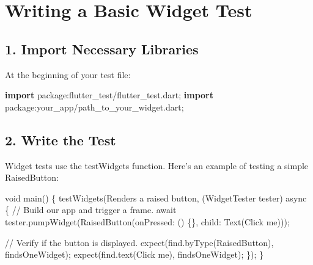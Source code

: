 \documentclass[
]{article}
\newenvironment{Shaded}{\begin{snugshade}}{\end{snugshade}}
\newcommand{\AttributeTok}[1]{\textcolor[rgb]{0.16,0.50,0.73}{#1}}
\newcommand{\CommentTok}[1]{\textcolor[rgb]{0.48,0.49,0.49}{#1}}
\newcommand{\DataTypeTok}[1]{\textcolor[rgb]{0.16,0.50,0.73}{#1}}
\newcommand{\KeywordTok}[1]{\textcolor[rgb]{0.81,0.81,0.76}{\textbf{#1}}}
\newcommand{\NormalTok}[1]{\textcolor[rgb]{0.81,0.81,0.76}{#1}}
\newcommand{\OperatorTok}[1]{\textcolor[rgb]{0.81,0.81,0.76}{#1}}
\newcommand{\StringTok}[1]{\textcolor[rgb]{0.96,0.31,0.31}{#1}}
\begin{document}
\section{Writing a Basic Widget Test}\label{writing-a-basic-widget-test}

\subsection{1. Import Necessary
Libraries}\label{import-necessary-libraries}

At the beginning of your test file:

\begin{Shaded}
\begin{Highlighting}[]
\KeywordTok{import} \StringTok{\textquotesingle{}package:flutter\_test/flutter\_test.dart\textquotesingle{}}\NormalTok{;}
\KeywordTok{import} \StringTok{\textquotesingle{}package:your\_app/path\_to\_your\_widget.dart\textquotesingle{}}\NormalTok{;}
\end{Highlighting}
\end{Shaded}

\subsection{2. Write the Test}\label{write-the-test-1}

Widget tests use the testWidgets function. Here's an example of testing
a simple RaisedButton:

\begin{Shaded}
\begin{Highlighting}[]
\DataTypeTok{void}\NormalTok{ main() }\OperatorTok{\{}
\NormalTok{  testWidgets(}\StringTok{\textquotesingle{}Renders a raised button\textquotesingle{}}\OperatorTok{,}\NormalTok{ (WidgetTester tester) }\AttributeTok{async} \OperatorTok{\{}
    \CommentTok{// Build our app and trigger a frame.}
    \AttributeTok{await}\NormalTok{ tester}\OperatorTok{.}\NormalTok{pumpWidget(RaisedButton(onPressed}\OperatorTok{:}\NormalTok{ () }\OperatorTok{\{\},}\NormalTok{ child}\OperatorTok{:}\NormalTok{ Text(}\StringTok{\textquotesingle{}Click me\textquotesingle{}}\NormalTok{)));}

    \CommentTok{// Verify if the button is displayed.}
\NormalTok{    expect(find}\OperatorTok{.}\NormalTok{byType(RaisedButton)}\OperatorTok{,}\NormalTok{ findsOneWidget);}
\NormalTok{    expect(find}\OperatorTok{.}\NormalTok{text(}\StringTok{\textquotesingle{}Click me\textquotesingle{}}\NormalTok{)}\OperatorTok{,}\NormalTok{ findsOneWidget);}
  \OperatorTok{\}}\NormalTok{);}
\OperatorTok{\}}
\end{Highlighting}
\end{Shaded}
\end{document}
